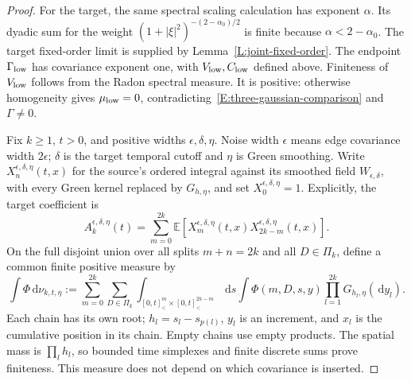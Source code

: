 \documentclass[12pt]{article}
\numberwithin{equation}{section}
\theoremstyle{definition}
\newcommand{\E}{\mathbb{E}}
\newcommand{\ud}{\,\mathrm{d}}
\begin{document}
\begin{proof}
  For the target, the same spectral scaling calculation has exponent
  $\alpha$. Its dyadic sum for the weight
  $(1+|\xi|^2)^{-(2-\alpha_0)/2}$ is finite because
  $\alpha<2-\alpha_0$. The target fixed-order limit is supplied by
  Lemma~\ref{L:joint-fixed-order}. The endpoint $\Gamma_{\rm low}$ has covariance
  exponent one, with $V_{\rm low},C_{\rm low}$ defined above.
  Finiteness of $V_{\rm low}$ follows from the Radon spectral measure.
  It is positive: otherwise homogeneity gives $\mu_{\rm low}=0$,
  contradicting~\eqref{E:three-gaussian-comparison} and $\Gamma\ne0$.

  Fix $k\ge1$, $t>0$, and positive widths $\epsilon,\delta,\eta$.
  Noise width $\epsilon$ means edge covariance width $2\epsilon$;
  $\delta$ is the target temporal cutoff and $\eta$ is Green smoothing.
  Write $X_n^{\epsilon,\delta,\eta}(t,x)$ for the source's ordered
  integral against its smoothed field $W_{\epsilon,\delta}$, with
  every Green kernel replaced by $G_{h,\eta}$, and set
  $X_0^{\epsilon,\delta,\eta}=1$. Explicitly, the target coefficient is
  \[
    A_k^{\epsilon,\delta,\eta}(t)
    =\sum_{m=0}^{2k}
    \E\left[X_m^{\epsilon,\delta,\eta}(t,x)
    X_{2k-m}^{\epsilon,\delta,\eta}(t,x)\right].
  \]
  On the full disjoint union over all splits $m+n=2k$ and all
  $D\in\Pi_k$, define a common finite positive measure by
  \[
    \int\Phi\ud\nu_{k,t,\eta}
    :=\sum_{m=0}^{2k}\sum_{D\in\Pi_k}
    \int_{[0,t]^m_<\times[0,t]^{2k-m}_<}\ud s
    \int\Phi(m,D,s,y)\prod_{l=1}^{2k}G_{h_l,\eta}(\ud y_l).
  \]
  Each chain has its own root; $h_l=s_l-s_{p(l)}$, $y_l$ is an
  increment, and $x_l$ is the cumulative position in its chain.
  Empty chains use empty products. The spatial mass is $\prod_lh_l$,
  so bounded time simplexes and finite discrete sums prove finiteness.
  This measure does not depend on which covariance is inserted.


\end{proof}
\end{document}
